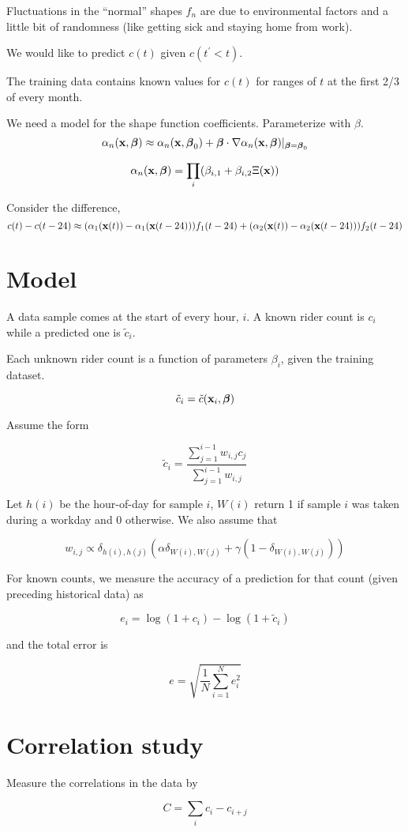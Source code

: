 \documentclass{article}
\newcommand{\bx}{{\bf x}}
\newcommand{\bbeta}{\boldsymbol\beta}
\begin{document}
Fluctuations in the ``normal'' shapes $f_n$ are due to environmental
factors and a little bit of randomness (like getting sick and staying
home from work).

We would like to predict $c(t)$ given $c(t^{\prime} < t)$.

The training data contains known values for $c(t)$ for ranges of $t$
at the first 2/3 of every month.


We need a model for the shape function coefficients. Parameterize with
$\beta$.
\[
\alpha_n(\bx, \bbeta) \approx \alpha_n(\bx, \bbeta_0) + \bbeta \cdot \nabla
\alpha_n(\bx, \bbeta) |_{\bbeta = \bbeta_0}
\]

\[
\alpha_n(\bx, \bbeta) = \prod_i (\beta_{i,1} + \beta_{i,2} \Xi(\bx))
\]

Consider the difference,
\[
c(t) - c(t - 24) \approx
(\alpha_1(\bx(t)) - \alpha_1(\bx(t - 24))) f_1(t - 24) +
(\alpha_2(\bx(t)) - \alpha_2(\bx(t - 24))) f_2(t - 24)
\]

\section*{Model}

A data sample comes at the start of every hour, $i$. A known rider
count is $c_i$ while a predicted one is $\tilde{c}_i$.

Each unknown rider count is a function of parameters $\beta_i$, given the
training dataset.

\[
\tilde{c}_i = \tilde{c}(\bx_i, \bbeta)
\]

Assume the form

\[
\tilde{c}_i = \frac{\sum_{j=1}^{i-1} w_{i,j} c_j}{\sum_{j=1}^{i-1}
w_{i,j}}
\]


Let $h(i)$ be the hour-of-day for sample $i$, $W(i)$ return 1 if
sample $i$ was taken during a workday and 0 otherwise. We also assume that

\[
w_{i,j} \propto \delta_{h(i),h(j)} (\alpha \delta_{W(i),W(j)} + \gamma (1 - \delta_{W(i),W(j)}))
\]

For known counts, we measure the accuracy of a prediction for that
count (given preceding historical data) as

\[
e_i = \log(1 + c_i) - \log(1 + \tilde{c}_i)
\]

and the total error is

\[
e = \sqrt{\frac{1}{N} \sum_{i=1}^N e_i^2}
\]


\section*{Correlation study}

Measure the correlations in the data by

\[
C = \sum_i c_i - c_{i+j}
\]
\end{document}

